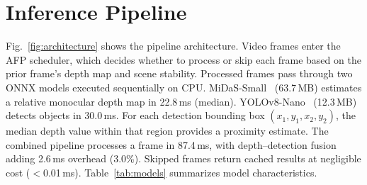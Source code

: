 \documentclass[conference]{IEEEtran}
\begin{document}
\section{Inference Pipeline}
\label{sec:pipeline}

Fig.~\ref{fig:architecture} shows the pipeline architecture. Video
frames enter the AFP scheduler, which decides whether to process or
skip each frame based on the prior frame's depth map and scene
stability. Processed frames pass through two ONNX models executed
sequentially on CPU. MiDaS-Small~\cite{ranftl2020midas} (63.7\,MB)
estimates a relative monocular depth map in 22.8\,ms (median).
YOLOv8-Nano~\cite{jocher2023yolov8} (12.3\,MB) detects objects in
30.0\,ms. For each detection bounding box $(x_1, y_1, x_2, y_2)$,
the median depth value within that region provides a proximity
estimate. The combined pipeline processes a frame in 87.4\,ms, with
depth--detection fusion adding 2.6\,ms overhead (3.0\%). Skipped
frames return cached results at negligible cost
($<$0.01\,ms). Table~\ref{tab:models} summarizes model
characteristics.
\end{document}

